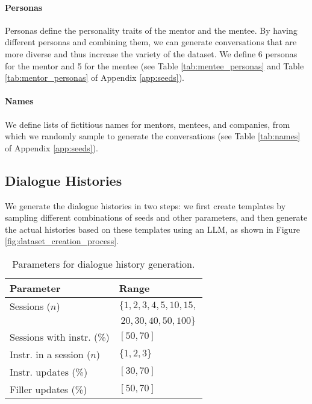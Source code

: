 \paragraph{Personas} Personas define the personality traits of the mentor and the mentee. 
By having different personas and combining them, we can generate conversations that are more diverse and thus increase the variety of the dataset. We define 6 personas for the mentor and 5 for the mentee (see Table \ref{tab:mentee_personas} and Table \ref{tab:mentor_personas} of Appendix \ref{app:seeds}). 

\paragraph{Names} We define lists of fictitious names for mentors, mentees, and companies, from which we randomly sample to generate the conversations (see Table \ref{tab:names} of Appendix \ref{app:seeds}). 

\subsection{Dialogue Histories}
\label{subsec:dataset_creation}

We generate the dialogue histories in two steps: we first create templates by sampling different combinations of seeds and other parameters, and then generate the actual histories based on these templates using an LLM, as shown in Figure \ref{fig:dataset_creation_process}.


\begin{table}[]
\begin{tabular}{ll}
\toprule
\textbf{Parameter}      & \textbf{Range}                                                                   \\
\midrule
Sessions ($n$)          & $$\{1,2,3,4,5,10,15,$$ \\ & $$20,30,40,50,100\}$$ \\
Sessions with instr. (\%)               &   $[50, 70]$                                                                    \\
Instr. in a session ($n$) &  $\{1,2,3\}$                                                                     \\
Instr. updates (\%)      & $[30, 70]$                                                                       \\
Filler updates (\%)      & $[50, 70]$     \\                          
\bottomrule
\end{tabular}
\caption{Parameters for dialogue history generation.}
\label{tab:parameters_range}
\end{table}



